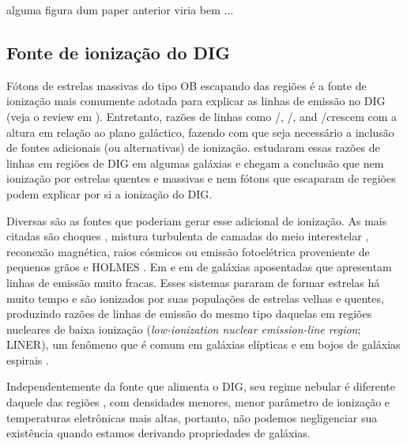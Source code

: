 {\ATR \ojo alguma figura dum paper anterior viria bem ...}

\subsection{Fonte de ionização do DIG}
\label{sec:intro:DIG:source}
Fótons de estrelas massivas do tipo OB escapando das regiões \hii é a fonte de ionização mais comumente adotada para explicar as linhas de emissão no DIG (veja o review em \citealt{Haffner.etal.2009}). Entretanto, razões de linhas como \nii/\Ha, \sii/\Ha, and \oiii/\Hb crescem com a altura em relação ao plano galáctico, fazendo com que seja necessário a inclusão de fontes adicionais (ou alternativas) de ionização. \citet{HoopesWalt.2003} estudaram essas razões de linhas em regiões de DIG em algumas galáxias e chegam a conclusão que nem ionização por estrelas quentes e massivas e nem fótons que escaparam de regiões \hii podem explicar por si a ionização do DIG.

Diversas são as fontes que poderiam gerar esse adicional de ionização. As mais citadas são choques \citep{CollinsRand.2001}, mistura turbulenta de camadas do meio interestelar \citep{SlavinShullBegelman.1993, Binette.etal.2009a}, reconexão magnética, raios cósmicos ou emissão fotoelétrica proveniente de pequenos grãos \citep{Reynolds.etal.2001} e HOLMES \citep{FloresFajardo.etal.2011a}. Em \citet{Stasinska.etal.2008a} e em \citet{CidFernandes.etal.2011a}  de galáxias aposentadas que apresentam linhas de emissão muito fracas. Esses sistemas pararam de formar estrelas há muito tempo e são ionizados por suas populações de estrelas velhas e quentes, produzindo razões de linhas de emissão do mesmo tipo daquelas em regiões nucleares de baixa ionização ({\em low-ionization nuclear emission-line region}; LINER), um fenômeno que é comum em galáxias elípticas e em bojos de galáxias espirais \citep{Sarzi.etal.2010, Gomes.etal.2016a, Belfiore.etal.2016}.

Independentemente da fonte que alimenta o DIG, seu regime nebular é diferente daquele das regiões \hii, com densidades menores, menor parâmetro de ionização e temperaturas eletrônicas mais altas, portanto, não podemos negligenciar sua existência quando estamos derivando propriedades de galáxias.

